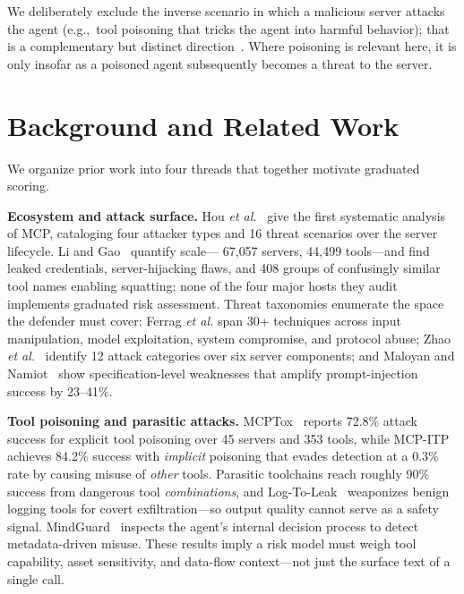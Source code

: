 \documentclass[conference]{IEEEtran}
\newcommand{\eg}{e.g.,\ }
\begin{document}
We deliberately exclude the inverse scenario in which a malicious server attacks
the agent (\eg tool poisoning that tricks the agent into harmful behavior); that
is a complementary but distinct direction~\cite{wang2025mcptox,wang2026mindguard}.
Where poisoning is relevant here, it is only insofar as a poisoned agent
subsequently becomes a threat to the server.

\section{Background and Related Work}
\label{sec:related}

We organize prior work into four threads that together motivate graduated scoring.

\noindent\textbf{Ecosystem and attack surface.}
Hou \emph{et al.}~\cite{hou2025mcp_landscape} give the first systematic analysis
of MCP, cataloging four attacker types and 16 threat scenarios over the
server lifecycle. Li and Gao~\cite{li2025understanding_mcp} quantify scale---
67{,}057 servers, 44{,}499 tools---and find leaked credentials, server-hijacking
flaws, and 408 groups of confusingly similar tool names enabling squatting; none
of the four major hosts they audit implements graduated risk assessment. Threat
taxonomies enumerate the space the defender must cover: Ferrag \emph{et al.}
\cite{ferrag2025prompt_to_protocol} span 30+ techniques across input
manipulation, model exploitation, system compromise, and protocol abuse;
Zhao \emph{et al.}~\cite{zhao2025when_mcp_servers_attack} identify 12 attack
categories over six server components; and Maloyan and
Namiot~\cite{maloyan2026breaking_protocol} show specification-level weaknesses
that amplify prompt-injection success by 23--41\%.

\noindent\textbf{Tool poisoning and parasitic attacks.}
MCPTox~\cite{wang2025mcptox} reports 72.8\% attack success for explicit tool
poisoning over 45 servers and 353 tools, while MCP-ITP~\cite{li2026mcp_itp}
achieves 84.2\% success with \emph{implicit} poisoning that evades detection at a
0.3\% rate by causing misuse of \emph{other} tools. Parasitic toolchains
\cite{zhao2025mind_your_server} reach roughly 90\% success from dangerous tool
\emph{combinations}, and Log-To-Leak~\cite{hu2026log_to_leak} weaponizes benign
logging tools for covert exfiltration---so output quality cannot serve as a safety
signal. MindGuard~\cite{wang2026mindguard} inspects the agent's internal decision
process to detect metadata-driven misuse. These results imply a risk model must
weigh tool capability, asset sensitivity, and data-flow context---not just the
surface text of a single call.
\end{document}
